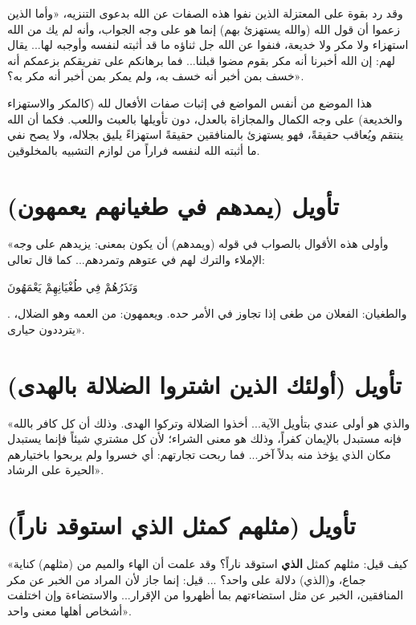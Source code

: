 وقد رد  بقوة على المعتزلة الذين نفوا هذه الصفات عن الله بدعوى التنزيه،  «وأما الذين زعموا أن قول الله (والله يستهزئ بهم) إنما هو على وجه الجواب، وأنه لم يك من الله استهزاء ولا مكر ولا خديعة، فنفوا عن الله جل ثناؤه ما قد أثبته لنفسه وأوجبه لها... يقال لهم: إن الله أخبرنا أنه مكر بقوم مضوا قبلنا... فما برهانكم على تفريقكم بزعمكم أنه خسف بمن أخبر أنه خسف به، ولم يمكر بمن أخبر أنه مكر به؟».

\begin{fawaid}
هذا الموضع من أنفس المواضع في إثبات صفات الأفعال لله (كالمكر والاستهزاء والخديعة) على وجه الكمال والمجازاة بالعدل، دون تأويلها بالعبث واللعب. فكما أن الله ينتقم ويُعاقب حقيقةً، فهو يستهزئ بالمنافقين حقيقةً استهزاءً يليق بجلاله، ولا يصح نفي ما أثبته الله لنفسه فراراً من لوازم التشبيه بالمخلوقين.
\end{fawaid}

\separator

\section{تأويل (يمدهم في طغيانهم يعمهون)}
 «وأولى هذه الأقوال بالصواب في قوله (ويمدهم) أن يكون بمعنى: يزيدهم على وجه الإملاء والترك لهم في عتوهم وتمردهم... كما قال تعالى: \begin{ayah}وَنَذَرُهُمْ فِي طُغْيَانِهِمْ يَعْمَهُونَ\end{ayah}. والطغيان: الفعلان من طغى إذا تجاوز في الأمر حده. ويعمهون: من العمه وهو الضلال، يترددون حيارى».

\section{تأويل (أولئك الذين اشتروا الضلالة بالهدى)}
 «والذي هو أولى عندي بتأويل الآية... أخذوا الضلالة وتركوا الهدى. وذلك أن كل كافر بالله فإنه مستبدل بالإيمان كفراً، وذلك هو معنى الشراء؛ لأن كل مشتري شيئاً فإنما يستبدل مكان الذي يؤخذ منه بدلاً آخر... فما ربحت تجارتهم: أي خسروا ولم يربحوا باختيارهم الحيرة على الرشاد».

\separator

\section{تأويل (مثلهم كمثل الذي استوقد ناراً)}
 «كيف قيل: مثلهم كمثل \textbf{الذي} استوقد ناراً؟ وقد علمت أن الهاء والميم من (مثلهم) كناية جماع، و(الذي) دلالة على واحد؟ ... قيل: إنما جاز لأن المراد من الخبر عن مكر المنافقين، الخبر عن مثل استضاءتهم بما أظهروا من الإقرار... والاستضاءة وإن اختلفت أشخاص أهلها معنى واحد».

